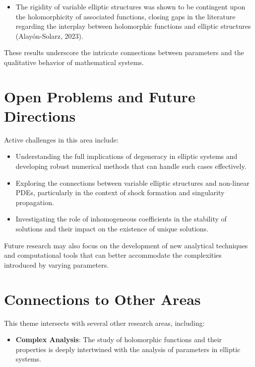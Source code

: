 \documentclass[11pt,a4paper]{article}
\begin{document}
\begin{itemize}
\item The rigidity of variable elliptic structures was shown to be contingent upon the holomorphicity of associated functions, closing gaps in the literature regarding the interplay between holomorphic functions and elliptic structures (Alayón-Solarz, 2023).
\end{itemize}

These results underscore the intricate connections between parameters and the qualitative behavior of mathematical systems.

\section{Open Problems and Future Directions}
Active challenges in this area include:

\begin{itemize}
\item Understanding the full implications of degeneracy in elliptic systems and developing robust numerical methods that can handle such cases effectively.
\end{itemize}

\begin{itemize}
\item Exploring the connections between variable elliptic structures and non-linear PDEs, particularly in the context of shock formation and singularity propagation.
\end{itemize}

\begin{itemize}
\item Investigating the role of inhomogeneous coefficients in the stability of solutions and their impact on the existence of unique solutions.
\end{itemize}

Future research may also focus on the development of new analytical techniques and computational tools that can better accommodate the complexities introduced by varying parameters.

\section{Connections to Other Areas}
This theme intersects with several other research areas, including:

\begin{itemize}
\item \textbf{Complex Analysis}: The study of holomorphic functions and their properties is deeply intertwined with the analysis of parameters in elliptic systems.
\end{itemize}
\end{document}
